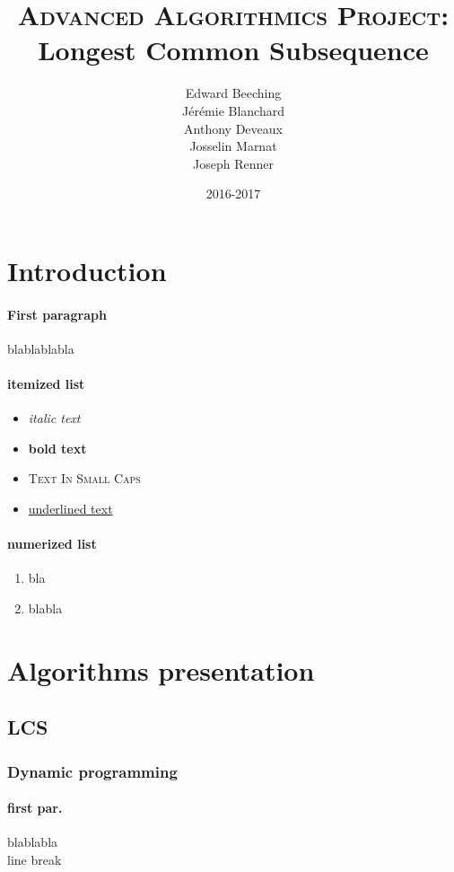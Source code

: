 \documentclass[a4paper,12pt]{article}
\title{\textsc{Advanced Algorithmics Project:}\\Longest Common Subsequence}
\author{Edward Beeching\\Jérémie Blanchard\\Anthony Deveaux\\Josselin Marnat\\Joseph Renner}
\date{2016-2017}
\begin{document}
	\maketitle
	\newpage

	\renewcommand\contentsname{\begin{center}Table of Contents\end{center}}
	\tableofcontents

	\newpage
	\section*{Introduction}
		\paragraph{First paragraph} blablablabla

		
		\paragraph{itemized list}
			\begin{itemize}
				\item \textit{italic text}
				\item \textbf{bold text}
				\item \textsc{Text In Small Caps}
				\item \underline{underlined text}
			\end{itemize}

		\paragraph{numerized list}
			\begin{enumerate}
				\item bla
				\item blabla
			\end{enumerate}

	\newpage
	\section{Algorithms presentation}
		\subsection{LCS}
			\subsubsection{Dynamic programming}
				\paragraph{first par.} blablabla \\
				line break
\end{document}
